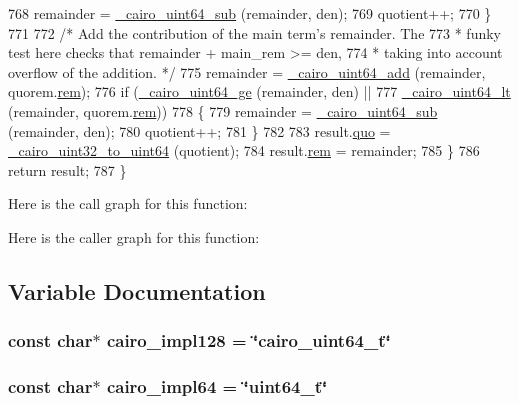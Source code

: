 \begin{DoxyCode}
768             remainder = \hyperlink{cairo-wideint-private_8h_a886253cbf8a04593b046e35bcf51c45c}{\_cairo\_uint64\_sub} (remainder, den);
769             quotient++;
770         \}
771 
772         \textcolor{comment}{/* Add the contribution of the main term's remainder. The}
773 \textcolor{comment}{         * funky test here checks that remainder + main\_rem >= den,}
774 \textcolor{comment}{         * taking into account overflow of the addition. */}
775         remainder = \hyperlink{cairo-wideint-private_8h_a233d42c3678deb29983fdead5483b03d}{\_cairo\_uint64\_add} (remainder, quorem.\hyperlink{struct__cairo__uquorem64_af360df0b81f94d6ac85f4cec13bb7431}{rem});
776         \textcolor{keywordflow}{if} (\hyperlink{cairo-wideint-private_8h_a5be6bbec2247f8f89c0904b9aa6fc012}{\_cairo\_uint64\_ge} (remainder, den) ||
777             \hyperlink{cairo-wideint-private_8h_a2cc85e3ec519a71b4c52f6e43affdace}{\_cairo\_uint64\_lt} (remainder, quorem.\hyperlink{struct__cairo__uquorem64_af360df0b81f94d6ac85f4cec13bb7431}{rem}))
778         \{
779             remainder = \hyperlink{cairo-wideint-private_8h_a886253cbf8a04593b046e35bcf51c45c}{\_cairo\_uint64\_sub} (remainder, den);
780             quotient++;
781         \}
782 
783         result.\hyperlink{struct__cairo__uquorem64_aa1ba1d4582ee46d1769ff01d63242ac8}{quo} = \hyperlink{cairo-wideint-private_8h_ae6926b42ba8d416207a6327091462d3d}{\_cairo\_uint32\_to\_uint64} (quotient);
784         result.\hyperlink{struct__cairo__uquorem64_af360df0b81f94d6ac85f4cec13bb7431}{rem} = remainder;
785     \}
786     \textcolor{keywordflow}{return} result;
787 \}
\end{DoxyCode}


Here is the call graph for this function\+:




Here is the caller graph for this function\+:




\subsection{Variable Documentation}
\subsubsection[{\texorpdfstring{cairo\+\_\+impl128}{cairo_impl128}}]{\setlength{\rightskip}{0pt plus 5cm}const char$\ast$ cairo\+\_\+impl128 = \char`\"{}cairo\+\_\+uint64\+\_\+t\char`\"{}}\hypertarget{cairo-wideint_8c_a660c34af82df7595e1a029af6c5f799f}{}\label{cairo-wideint_8c_a660c34af82df7595e1a029af6c5f799f}
\subsubsection[{\texorpdfstring{cairo\+\_\+impl64}{cairo_impl64}}]{\setlength{\rightskip}{0pt plus 5cm}const char$\ast$ cairo\+\_\+impl64 = \char`\"{}uint64\+\_\+t\char`\"{}}\hypertarget{cairo-wideint_8c_a49cff5896e8f00bbdd461db2f8024ea1}{}\label{cairo-wideint_8c_a49cff5896e8f00bbdd461db2f8024ea1}
